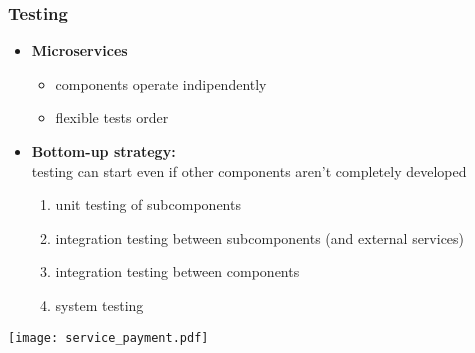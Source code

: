 
\begin{frame}
	\frametitle{Testing}
	\begin{itemize}
		\item \textbf{Microservices}
		\begin{itemize}
			\item components operate indipendently
			\item flexible tests order
		\end{itemize}
		\pause
		\item \textbf{Bottom-up strategy:} \\ testing can start even if other components aren't completely developed
		\begin{enumerate}
			\item unit testing of subcomponents
			\item integration testing between subcomponents (and external services)
			\item integration testing between components
			\item system testing
		\end{enumerate}
	\end{itemize}	
\end{frame}

\begin{frame}
	\texttt{[image: service\_payment.pdf]}
\end{frame}
